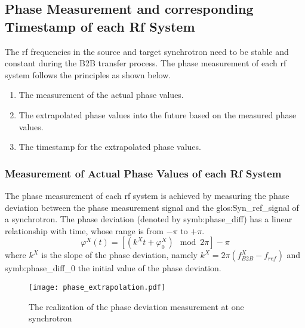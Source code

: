\subsection{Phase Measurement and corresponding Timestamp of each Rf System}
The rf frequencies in the source and target synchrotron need to be stable and constant during the B2B transfer process. The phase measurement of each rf system follows the principles as shown below.

\begin{enumerate}
\item The measurement of the actual phase values.
\item The extrapolated phase values into the future based on the measured phase values.
\item The timestamp for the extrapolated phase values.
\end{enumerate}


 \subsubsection{Measurement of Actual Phase Values of each Rf System}
The phase measurement of each rf system is achieved by measuring the phase deviation between the phase measurement signal and the \gls{glos:Syn_ref_signal} of a synchrotron. The phase deviation (denoted by \gls{symb:phase_diff}) has a linear relationship with time, whose range is from $-\pi$ to $+\pi$. 
\begin{equation}
\varphi^X(t)= [(k^\mathit{X}t+\varphi^X_0) \mod 2\pi] - \pi
\end{equation}
where $k^\mathit{X}$ is the slope of the phase deviation, namely $k^\mathit{X}=2\pi(f_\mathit{B2B}^{X}-f_\mathit{ref})$ and \gls{symb:phase_diff_0} the initial value of the phase deviation.



\begin{figure}[!htb]
   \centering   
   \texttt{[image: phase\_extrapolation.pdf]}
   \caption{The realization of the phase deviation measurement at one synchrotron}
   \label{phase_prediction}
\end{figure}

